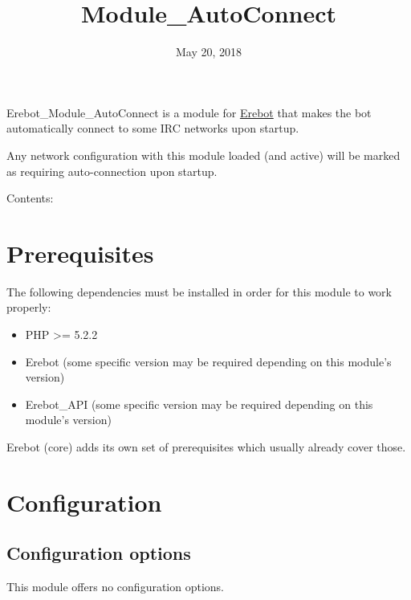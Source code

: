 \documentclass[letterpaper,10pt,english]{sphinxmanual}
\title{Module_AutoConnect}
\date{May 20, 2018}
\author{}
\begin{document}
\maketitle
\tableofcontents
{}\label{index::doc}\begin{quote}
\end{quote}



Erebot\_Module\_AutoConnect is a module for \href{https://www.erebot.net/}{Erebot} that makes the bot
automatically connect to some IRC networks upon startup.

Any network configuration with this module loaded (and active) will
be marked as requiring auto-connection upon startup.

Contents:
\begin{quote}
\end{quote}


\chapter{Prerequisites}
\label{Prerequisites:prerequisites}\label{Prerequisites:welcome-to-the-documentation-for-erebot-module-autoconnect}\label{Prerequisites::doc}
The following dependencies must be installed in order for this module
to work properly:
\begin{itemize}
\item {} 
PHP \textgreater{}= 5.2.2

\item {} 
Erebot (some specific version may be required depending
on this module's version)

\item {} 
Erebot\_API (some specific version may be required depending
on this module's version)

\end{itemize}

Erebot (core) adds its own set of prerequisites which usually already
cover those.
\begin{quote}
\end{quote}


\chapter{Configuration}
\label{Configuration:configuration}\label{Configuration::doc}\label{Configuration:id1}

\section{Configuration options}
\label{Configuration:configuration-options}
This module offers no configuration options.
\end{document}

